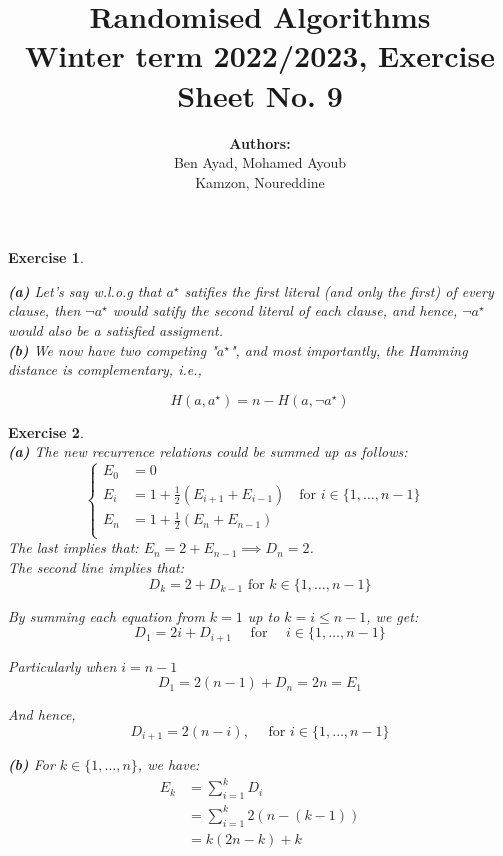 \documentclass{article}
\title{Randomised Algorithms \\
Winter term 2022/2023, Exercise Sheet No. 9}
\author{
    \textbf{Authors:} \\
    Ben Ayad, Mohamed Ayoub \\
    Kamzon, Noureddine
}
\newtheorem{exo}{Exercise}
\begin{document}
\maketitle


\begin{exo}{\ \\}

\noindent
\textbf{(a)} Let's say w.l.o.g  that $a^\star$ satifies the first literal (and only the first) of every clause, then $\neg{a^\star}$ would satify the second literal of each clause, and hence, $\neg{a^\star}$  would also be a satisfied assigment. \\

\noindent
\textbf{(b)} We now have two competing "$a^\star$", and most importantly, the Hamming distance is complementary, i.e.,

\[
    H(a, a^\star) = n - H(a, \neg{a^\star})
\]




    
\end{exo}
\begin{exo}{\ \\}
\noindent 
\textbf{(a)} The new recurrence relations could be summed up as follows:
\[
\begin{cases}
    E_0 
    &= 0 \\
    E_i 
    &= 1 + \frac{1}{2} (E_{i+1}+E_{i-1})
    \quad \text{for $i \in \{1, \dots, n-1\}$ }
    \\
    E_n 
    &= 1 + \frac{1}{2} (E_{n}+E_{n-1})\\
\end{cases}
\]
The last implies that: $E_n = 2 +E_{n-1} \implies D_n = 2$.\\   
The second line implies that:
\[
D_k = 2 + D_{k-1} \text{ for } k \in \{1, \dots, n-1\}
\]

By summing each equation from $k=1$ up to $k = i \leq n-1$, we get:
\[
D_1 = 2i + D_{i+1}\quad \text{ for } \quad i \in \{1, \dots, n-1\}
\]

Particularly when $i=n-1$
\[
D_1 = 2(n-1) + D_{n} = 2n = E_1
\]

And hence, \[
D_{i+1} = 2(n-i), \quad \text{ for } i \in \{1, \dots, n-1\}
\]
   
\noindent 
\textbf{(b)} For $k \in \{1, \dots, n\}$, we have:
\begin{align*}
E_k 
&= \sum^{k}_{i=1} D_i  \\   
&= \sum^{k}_{i=1} 2(n-(k-1)) \\
&= k (2n -k) + k
\end{align*}


\end{exo}
\end{document}
